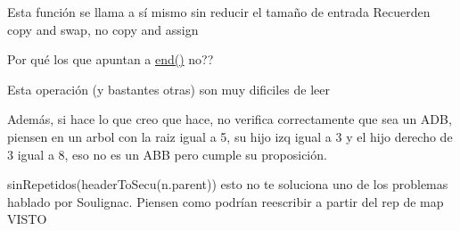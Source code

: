 \begin{DoxyRefList}
\item[\label{deprecated__deprecated000004}%
\hypertarget{deprecated__deprecated000004}{}%
Miembro \hyperlink{classaed2_1_1map_ac606d334809066929522964d45e76317_ac606d334809066929522964d45e76317}{aed2\+:\+:map$<$ Key, Meaning, Compare $>$\+:\+:operator=} (map other)]Esta función se llama a sí mismo sin reducir el tamaño de entrada Recuerden copy and swap, no copy and assign 
\item[\label{deprecated__deprecated000005}%
\hypertarget{deprecated__deprecated000005}{}%
Miembro \hyperlink{classaed2_1_1map_ab22c9a85c2dadbc286cd30e97069a8e6_ab22c9a85c2dadbc286cd30e97069a8e6}{aed2\+:\+:map$<$ Key, Meaning, Compare $>$\+:\+:$\sim$map} ()]Por qué los que apuntan a \hyperlink{classaed2_1_1map_a76023e6a56cb625513e1b5ea028bf983_a76023e6a56cb625513e1b5ea028bf983}{end()} no?? 
\item[\label{deprecated__deprecated000001}%
\hypertarget{deprecated__deprecated000001}{}%
Página \hyperlink{axiomas}{Axiomas y proposiciones auxiliares} ]Esta operación (y bastantes otras) son muy dificiles de leer 

Además, si hace lo que creo que hace, no verifica correctamente que sea un A\+DB, piensen en un arbol con la raiz igual a 5, su hijo izq igual a 3 y el hijo derecho de 3 igual a 8, eso no es un A\+BB pero cumple su proposición.

sin\+Repetidos(header\+To\+Secu(n.\+parent)) esto no te soluciona uno de los problemas hablado por Soulignac. Piensen como podrían reescribir a partir del rep de map V\+I\+S\+TO
\end{DoxyRefList}